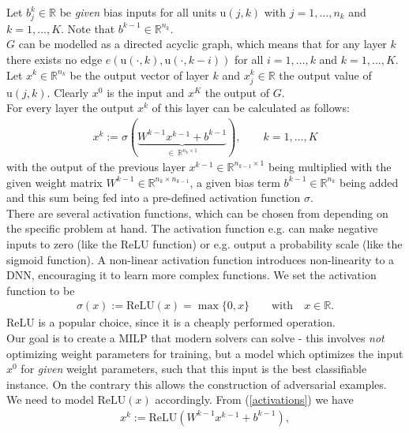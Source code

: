 \documentclass{article}
\begin{document}
Let $b^{k}_j \in \mathbb{R}$ be \textit{given} bias inputs for all units $\text{u}(j,k)$ with $j=1,\ldots,n_{k}$ and $k = 1, \ldots, K$. Note that $b^{k-1} \in \mathbb{R}^{n_k}$.\\
$G$ can be modelled as a directed acyclic graph, which means that for any layer $k$ there exists no edge $e(\text{u}(\cdot,k),\text{u}(\cdot,k-i))$ for all $i=1,\ldots,k$ and $k=1, \ldots, K$.\\
Let $x^k \in \mathbb{R}^{n_k}$ be the output vector of layer $k$ and $x^k_j \in \mathbb{R}$ the output value of $\text{u}(j,k)$.
Clearly $x^0$ is the input and $x^K$ the output of $G$.\\
For every layer the output $x^k$ of this layer can be calculated as follows:
\begin{align} \label{activations}
x^k := \sigma ( \underbrace{W^{k-1} x^{k-1} + b^{k-1}}_{\in \ \mathbb{R}^{n_k \times 1}}), \qquad k=1, \ldots, K
\end{align}
with the output of the previous layer $x^{k-1} \in \mathbb{R}^{n_{k-1} \times 1}$ being multiplied with the given weight matrix $W^{k-1} \in \mathbb{R}^{n_k \times n_{k-1}}$, a given bias term $b^{k-1} \in \mathbb{R}^{n_k}$ being added and this sum being fed into a pre-defined activation function $\sigma$.\\
There are several activation functions, which can be chosen from depending on the specific problem at hand. The activation function e.g. can make negative inputs to zero (like the ReLU function) or e.g. output a probability scale (like the sigmoid function). A non-linear activation function introduces non-linearity to a DNN, encouraging it to learn more complex functions. We set the activation function to be
\begin{align} \label{relu}
\sigma (x) := \mathrm{ReLU}(x) = \max \{ 0, x\} \qquad \text{with} \quad x \in \mathbb{R}.
\end{align}
ReLU is a popular choice, since it is a cheaply performed operation.
\\
Our goal is to create a MILP that modern solvers can solve - this involves \textit{not} optimizing weight parameters for training, but a model which optimizes the input $x^0$ for \textit{given} weight parameters, such that this input is the best classifiable instance. On the contrary this allows the construction of adversarial examples.\\
We need to model $\text{ReLU}(x)$ accordingly. From (\ref{activations}) we have
\begin{align} \label{relu_in_model}
x^k := \text{ReLU} ( W^{k-1} x^{k-1} + b^{k-1}),
\end{align}
\end{document}
